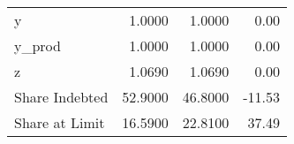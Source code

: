 \begin{table}
\begin{tabular}{lrrr}
             y &                1.0000 &                 1.0000 &            0.00 \\
        y\_prod &                1.0000 &                 1.0000 &            0.00 \\
             z &                1.0690 &                 1.0690 &            0.00 \\
Share Indebted &               52.9000 &                46.8000 &          -11.53 \\
Share at Limit &               16.5900 &                22.8100 &           37.49 \\
\bottomrule
\end{tabular}
\end{table}
